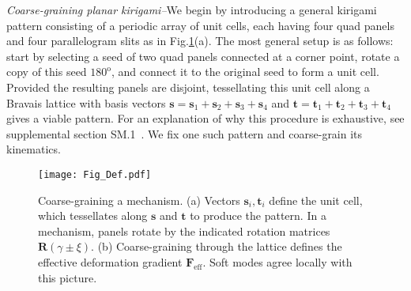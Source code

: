 \documentclass[aps,prl,twocolumn,superscriptaddress]{revtex4-1}
\begin{document}
\textit{Coarse-graining planar kirigami\;--}\;We begin by introducing a general kirigami pattern consisting of a periodic array of unit cells, each having four quad panels and four parallelogram slits as in Fig.\;\ref{fig:RigidDef}(a). The most general setup is  as follows: start by selecting a seed of two quad panels connected at a corner point, rotate a copy of this seed $180^{\mathrm{o}}$, and connect it to the original seed to form a unit cell. Provided the resulting panels are disjoint, tessellating this unit cell along a Bravais lattice with basis vectors $\mathbf{s} = \mathbf{s}_1 + \mathbf{s}_2 + \mathbf{s}_3 + \mathbf{s}_4$ and $\mathbf{t} = \mathbf{t}_1 + \mathbf{t}_2 + \mathbf{t}_3 + \mathbf{t}_4$ gives a viable pattern. For an explanation of why this procedure is exhaustive, see supplemental section SM.1~\cite{suppl}. We fix one such pattern  and coarse-grain its kinematics. %
 
 \begin{figure}
\centering
\texttt{[image: Fig\_Def.pdf]}
\caption{Coarse-graining a mechanism. (a) Vectors $\mathbf{s}_i,\mathbf{t}_i$ define the unit cell, which tessellates along $\mathbf{s}$ and $\mathbf{t}$ to produce the pattern. In a mechanism, panels rotate by the indicated rotation matrices $\mathbf{R}(\gamma \pm \xi)$.  (b) Coarse-graining through the lattice defines the effective deformation gradient $\mathbf{F}_{\text{eff}}$. Soft modes agree locally with this picture.}
\label{fig:RigidDef}
\end{figure}
\end{document}

